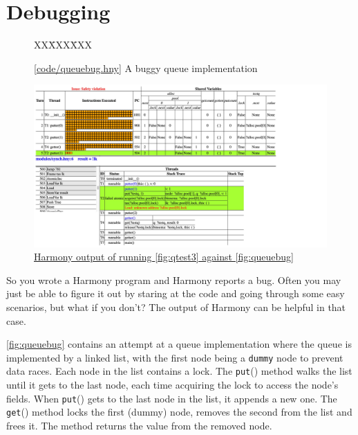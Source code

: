 \documentclass{report}
\newcommand{\harmonysource}[1]{
\begin{tabbing}
XX\=XXX\=XXX\kill
    
\end{tabbing}
}
\newcommand{\harmonylink}[1]{%
[\href{https://harmony.cs.cornell.edu/#1}{\underline{#1}}]%
}
\newcommand{\harmonyref}[2]{%
\href{https://harmony.cs.cornell.edu/output/#1}{\underline{#2}}%
}
\newenvironment{code}{
\tcolorbox
}{
\endtcolorbox
}
\begin{document}
\chapter{Debugging}
\label{ch:debugging}

\begin{figure}
\begin{code}
\harmonysource{queuebug}
\end{code}
\caption{\harmonylink{code/queuebug.hny} A buggy queue implementation}
\label{fig:queuebug}
\end{figure}

\begin{figure}
\begin{center}
\includegraphics[width=\textwidth]{figures/queuebug1.pdf}
\end{center}
\caption{\harmonyref{queuebug.html}{Harmony output of running \autoref{fig:qtest3} against
\autoref{fig:queuebug}}}
\label{fig:queuebug1}
\end{figure}

So you wrote a Harmony program and Harmony reports a bug.
Often you may just be able to figure it out by staring at the code and
going through some easy scenarios, but what if you don't?
The output of Harmony can be helpful in that case.

\autoref{fig:queuebug} contains an attempt at a queue implementation
where the queue is implemented by a linked list, with the first node
being a \texttt{dummy} node to prevent data races.  Each node in the
list contains a lock.  The \texttt{put}() method walks the list until
it gets to the last node, each time acquiring the lock to access the
node's fields.  When \texttt{put}() gets to the last node in the list,
it appends a new one.  The \texttt{get}() method locks the first (dummy)
node, removes the second from the list and frees it.  The method returns
the value from the removed node.
\end{document}
